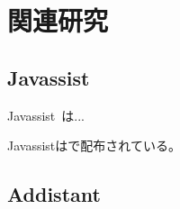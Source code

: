 \chapter{関連研究}

\section{Javassist}

Javassist~\cite{Chiba2000,Chiba2001a}は...

Javassistは\cite{Javassist}で配布されている。

\section{Addistant}

